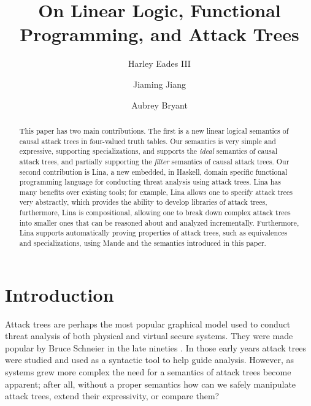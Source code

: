 \documentclass{llncs}
\date{}
\begin{document}
\title{On Linear Logic, Functional Programming, and Attack Trees}

\author{Harley Eades III \and Jiaming Jiang \and Aubrey Bryant}


\maketitle

\begin{abstract}
  This paper has two main contributions. The first is a new linear
  logical semantics of causal attack trees in four-valued truth
  tables.  Our semantics is very simple and expressive, supporting
  specializations, and supports the \emph{ideal} semantics of causal
  attack trees, and partially supporting the \emph{filter} semantics
  of causal attack trees. Our second contribution is Lina, a new
  embedded, in Haskell, domain specific functional programming
  language for conducting threat analysis using attack trees.  Lina
  has many benefits over existing tools; for example, Lina allows one
  to specify attack trees very abstractly, which provides the ability
  to develop libraries of attack trees, furthermore, Lina is
  compositional, allowing one to break down complex attack trees into
  smaller ones that can be reasoned about and analyzed incrementally.
  Furthermore, Lina supports automatically proving properties of
  attack trees, such as equivalences and specializations, using Maude
  and the semantics introduced in this paper.
\end{abstract}

\section{Introduction}
\label{sec:introduction}
Attack trees are perhaps the most popular graphical model used to
conduct threat analysis of both physical and virtual secure
systems. They were made popular by Bruce Schneier in the late nineties
\cite{Schneier:1999}.  In those early years attack trees were studied
and used as a syntactic tool to help guide analysis.  However, as
systems grew more complex the need for a semantics of attack trees
become apparent; after all, without a proper semantics how can we
safely manipulate attack trees, extend their expressivity, or compare
them?
\end{document}
